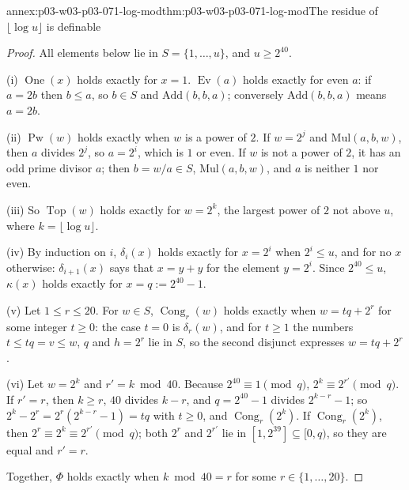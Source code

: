 \begin{annexitem}{annex:p03-w03-p03-071-log-mod}{thm:p03-w03-p03-071-log-mod}{The residue of \(\lfloor\log u\rfloor\) is definable}
\begin{proof}
All elements below lie in \(S=\{1,\ldots,u\}\), and \(u\geq2^{40}\).

(i) \(\operatorname{One}(x)\) holds exactly for \(x=1\).
\(\operatorname{Ev}(a)\) holds exactly for even \(a\): if \(a=2b\) then
\(b\leq a\), so \(b\in S\) and \(\mathrm{Add}(b,b,a)\); conversely
\(\mathrm{Add}(b,b,a)\) means \(a=2b\).

(ii) \(\operatorname{Pw}(w)\) holds exactly when \(w\) is a power of \(2\).
If \(w=2^j\) and \(\mathrm{Mul}(a,b,w)\), then \(a\) divides \(2^j\), so
\(a=2^i\), which is \(1\) or even.  If \(w\) is not a power of \(2\), it has
an odd prime divisor \(a\); then \(b=w/a\in S\), \(\mathrm{Mul}(a,b,w)\), and
\(a\) is neither \(1\) nor even.

(iii) So \(\operatorname{Top}(w)\) holds exactly for \(w=2^k\), the largest
power of \(2\) not above \(u\), where \(k=\lfloor\log u\rfloor\).

(iv) By induction on \(i\), \(\delta_i(x)\) holds exactly for \(x=2^i\) when
\(2^i\leq u\), and for no \(x\) otherwise: \(\delta_{i+1}(x)\) says that
\(x=y+y\) for the element \(y=2^i\).  Since \(2^{40}\leq u\), \(\kappa(x)\)
holds exactly for \(x=q:=2^{40}-1\).

(v) Let \(1\leq r\leq20\).  For \(w\in S\), \(\operatorname{Cong}_r(w)\)
holds exactly when \(w=tq+2^r\) for some integer \(t\geq0\): the case
\(t=0\) is \(\delta_r(w)\), and for \(t\geq1\) the numbers \(t\leq tq=v\leq
w\), \(q\) and \(h=2^r\) lie in \(S\), so the second disjunct expresses
\(w=tq+2^r\).

(vi) Let \(w=2^k\) and \(r'=k\bmod40\).  Because \(2^{40}\equiv1\pmod q\),
\(2^k\equiv2^{r'}\pmod q\).  If \(r'=r\), then \(k\geq r\), \(40\) divides
\(k-r\), and \(q=2^{40}-1\) divides \(2^{k-r}-1\); so
\(2^k-2^r=2^r(2^{k-r}-1)=tq\) with \(t\geq0\), and
\(\operatorname{Cong}_r(2^k)\).  If \(\operatorname{Cong}_r(2^k)\), then
\(2^r\equiv2^k\equiv2^{r'}\pmod q\); both \(2^r\) and \(2^{r'}\) lie in
\([1,2^{39}]\subseteq[0,q)\), so they are equal and \(r'=r\).

Together, \(\Phi\) holds exactly when \(k\bmod40=r\) for some
\(r\in\{1,\ldots,20\}\).
\end{proof}
\end{annexitem}

